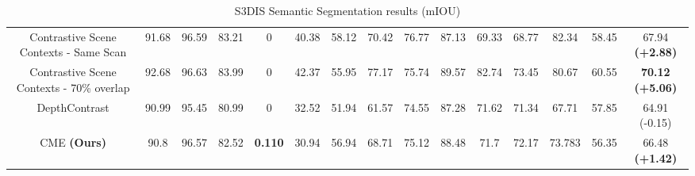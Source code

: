 \documentclass[10pt,twocolumn,letterpaper]{article}
\begin{document}
\begin{table}[t!]
{\begin{tabular}{ c | c c c c c c c c c c c c c | c }
            Contrastive Scene Contexts - Same Scan    & 91.68          & 96.59          & 83.21          & 0              & 40.38          & 58.12          & 70.42          & 76.77          & 87.13          & 69.33          & 68.77          & 82.34          & 58.45          & 67.94 \textbf{(+2.88)}          \\
            Contrastive Scene Contexts - 70\% overlap & 92.68          & 96.63          & 83.99          & 0              & 42.37          & 55.95          & 77.17          & 75.74          & 89.57          & 82.74          & 73.45          & 80.67          & 60.55          & \textbf{70.12} \textbf{(+5.06)} \\
            DepthContrast                             & 90.99          & 95.45          & 80.99          & 0              & 32.52          & 51.94          & 61.57          & 74.55          & 87.28          & 71.62          & 71.34          & 67.71          & 57.85          & 64.91 (-0.15)                   \\
            CME \textbf{(Ours)}                       & 90.8           & 96.57          & 82.52          & \textbf{0.110} & 30.94          & 56.94          & 68.71          & 75.12          & 88.48          & 71.7           & 72.17          & 73.783         & 56.35          & 66.48 \textbf{(+1.42)}          \\
        \end{tabular}
    }
    \caption{S3DIS Semantic Segmentation results (mIOU)}
    \label{table:s3disResults}
\end{table}
\end{document}
